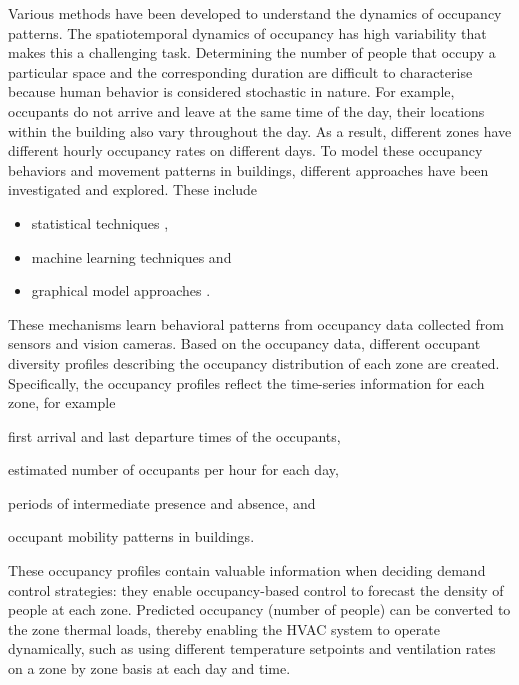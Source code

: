 Various methods have been developed to understand the dynamics of occupancy patterns. The spatiotemporal dynamics of occupancy has high variability that makes this a challenging task. Determining the number of people that occupy a particular space and the corresponding duration are difficult to characterise because human behavior is considered stochastic in nature. For example, occupants do not arrive and leave at the same time of the day, their locations within the building also vary throughout the day. As a result, different zones have different hourly occupancy rates on different days. To model these occupancy behaviors and movement patterns in buildings, different approaches have been investigated and explored. These include 
\begin{itemize}
	\item statistical techniques \citep{clevenger2006impact,page2008generalised,erickson2009energy,nassar2010model,goldstein2011space,liao2011novel,duarte2013revealing,chang2013statistical}, 
	\item machine learning techniques \citep{lam2009occupancy,yu2010modeling,yang2016building} and
	\item graphical model approaches \citep{hutchins2007modeling,dong2009sensor,meyn2009sensor,erickson2010occupancy,liao2010integrated,kamthe2011enabling}.
\end{itemize}
These mechanisms learn behavioral patterns from occupancy data collected from sensors and vision cameras. Based on the occupancy data, different occupant diversity profiles describing the occupancy distribution of each zone are created. Specifically, the occupancy profiles reflect the time-series information for each zone, for example 
\begin{enumerate*}[label=(\roman*)]
	\item first arrival and last departure times of the occupants,
	\item estimated number of occupants per hour for each day, %
	\item periods of intermediate presence and absence, and	
	\item occupant mobility patterns in buildings.
\end{enumerate*}

These occupancy profiles contain valuable information when deciding demand control strategies: they enable occupancy-based control to forecast the density of people at each zone. Predicted occupancy (number of people) can be converted to the zone thermal loads, thereby enabling the HVAC system to operate dynamically, such as using different temperature setpoints and ventilation rates on a zone by zone basis at each day and time. %

